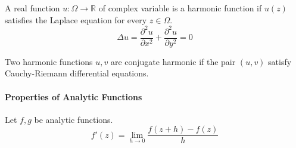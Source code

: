 \begin{definition}[harmonic]
	A real function $u : \Omega \to \mathbb{R}$ of complex variable is a harmonic function if $u(z)$ satisfies the Laplace equation for every $z \in \Omega$.
\begin{equation}
	\Delta u = \frac{\partial^2 u}{\partial x^2} + \frac{\partial^2 u}{\partial y^2} = 0
	\label{eqn:laplace}
\end{equation}
\end{definition}

\begin{definition}
	Two harmonic functions $u,v$ are conjugate harmonic if the pair $(u,v)$ satisfy Cauchy-Riemann differential equations.
\end{definition}

\paragraph{Properties of Analytic Functions}
Let $f,g$ be analytic functions.
\[ f'(z) = \lim_{h \to 0} \frac{f(z+h)-f(z)}{h} \]
